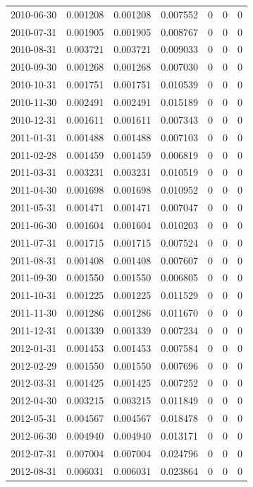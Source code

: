 \documentclass[conference,onecolumn]{IEEEtran}
\begin{document}
\begin{longtable}{|c|c|c|c|c|c|c|}
2010-06-30 & 0.001208 & 0.001208 & 0.007552 & 0 & 0 & 0 \\
2010-07-31 & 0.001905 & 0.001905 & 0.008767 & 0 & 0 & 0 \\
2010-08-31 & 0.003721 & 0.003721 & 0.009033 & 0 & 0 & 0 \\
2010-09-30 & 0.001268 & 0.001268 & 0.007030 & 0 & 0 & 0 \\
2010-10-31 & 0.001751 & 0.001751 & 0.010539 & 0 & 0 & 0 \\
2010-11-30 & 0.002491 & 0.002491 & 0.015189 & 0 & 0 & 0 \\
2010-12-31 & 0.001611 & 0.001611 & 0.007343 & 0 & 0 & 0 \\
2011-01-31 & 0.001488 & 0.001488 & 0.007103 & 0 & 0 & 0 \\
2011-02-28 & 0.001459 & 0.001459 & 0.006819 & 0 & 0 & 0 \\
2011-03-31 & 0.003231 & 0.003231 & 0.010519 & 0 & 0 & 0 \\
2011-04-30 & 0.001698 & 0.001698 & 0.010952 & 0 & 0 & 0 \\
2011-05-31 & 0.001471 & 0.001471 & 0.007047 & 0 & 0 & 0 \\
2011-06-30 & 0.001604 & 0.001604 & 0.010203 & 0 & 0 & 0 \\
2011-07-31 & 0.001715 & 0.001715 & 0.007524 & 0 & 0 & 0 \\
2011-08-31 & 0.001408 & 0.001408 & 0.007607 & 0 & 0 & 0 \\
2011-09-30 & 0.001550 & 0.001550 & 0.006805 & 0 & 0 & 0 \\
2011-10-31 & 0.001225 & 0.001225 & 0.011529 & 0 & 0 & 0 \\
2011-11-30 & 0.001286 & 0.001286 & 0.011670 & 0 & 0 & 0 \\
2011-12-31 & 0.001339 & 0.001339 & 0.007234 & 0 & 0 & 0 \\
2012-01-31 & 0.001453 & 0.001453 & 0.007584 & 0 & 0 & 0 \\
2012-02-29 & 0.001550 & 0.001550 & 0.007696 & 0 & 0 & 0 \\
2012-03-31 & 0.001425 & 0.001425 & 0.007252 & 0 & 0 & 0 \\
2012-04-30 & 0.003215 & 0.003215 & 0.011849 & 0 & 0 & 0 \\
2012-05-31 & 0.004567 & 0.004567 & 0.018478 & 0 & 0 & 0 \\
2012-06-30 & 0.004940 & 0.004940 & 0.013171 & 0 & 0 & 0 \\
2012-07-31 & 0.007004 & 0.007004 & 0.024796 & 0 & 0 & 0 \\
2012-08-31 & 0.006031 & 0.006031 & 0.023864 & 0 & 0 & 0 \\

\end{longtable}
\end{document}
